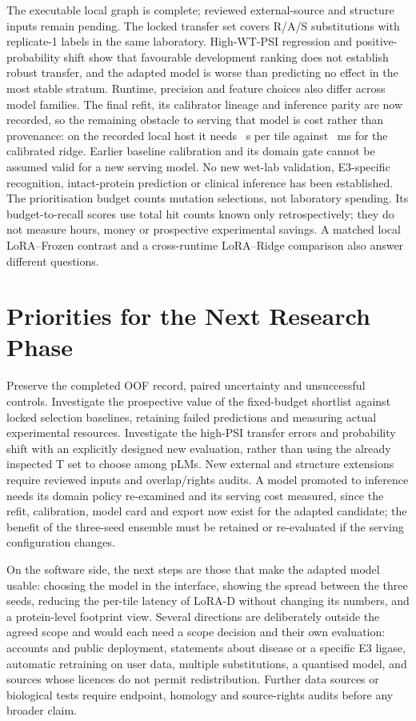 The executable local graph is complete; reviewed external-source and structure inputs remain pending.
The locked transfer set covers R/A/S substitutions with replicate-1 labels in the same laboratory.
High-WT-PSI regression and positive-probability shift show that favourable development ranking does
not establish robust transfer, and the adapted model is worse than predicting no effect in the most
stable stratum. Runtime, precision and feature choices also differ across model families. The final
refit, its calibrator lineage and inference parity are now recorded, so the remaining obstacle to
serving that model is cost rather than provenance: on the recorded local host it needs
\nTLatLora{}~s per tile against \nTLatRidge{}~ms for the calibrated ridge. Earlier baseline
calibration and its domain gate cannot be assumed valid for a new serving model.
No new wet-lab validation,
E3-specific recognition, intact-protein prediction or clinical inference has been established.
The prioritisation budget counts mutation selections, not laboratory spending. Its budget-to-recall
scores use total hit counts known only retrospectively; they do not measure hours, money or
prospective experimental savings. A matched local LoRA--Frozen contrast and a cross-runtime
LoRA--Ridge comparison also answer different questions.

\section{Priorities for the Next Research Phase}
Preserve the completed OOF record, paired uncertainty and unsuccessful controls. Investigate the
prospective value of the fixed-budget shortlist against locked selection baselines, retaining failed
predictions and measuring actual experimental resources. Investigate the
high-PSI transfer errors and probability shift with an explicitly designed new evaluation, rather than
using the already inspected T set to choose among pLMs. New external and structure extensions require
reviewed inputs and overlap/rights audits. A model promoted to inference needs its domain policy
re-examined and its serving cost measured, since the refit, calibration, model card and export now
exist for the adapted candidate; the benefit of the three-seed ensemble must be retained or
re-evaluated if the serving configuration changes.

On the software side, the next steps are those that make the adapted model usable: choosing the
model in the interface, showing the spread between the three seeds, reducing the per-tile latency of
LoRA-D without changing its numbers, and a protein-level footprint view. Several directions are
deliberately outside the agreed scope and would each need a scope decision and their own evaluation:
accounts and public deployment, statements about disease or a specific E3 ligase, automatic
retraining on user data, multiple substitutions, a quantised model, and sources whose licences do not
permit redistribution. Further data sources or biological tests require endpoint, homology and
source-rights audits before any broader claim.
